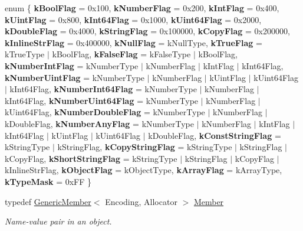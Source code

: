 \begin{DoxyCompactItemize}
\mbox{\label{classGenericValue_a57564d8ed9fe78975e047865be3bf7b9}} 
enum \{ \newline
{\bfseries k\+Bool\+Flag} = 0x100, 
{\bfseries k\+Number\+Flag} = 0x200, 
{\bfseries k\+Int\+Flag} = 0x400, 
{\bfseries k\+Uint\+Flag} = 0x800, 
\newline
{\bfseries k\+Int64\+Flag} = 0x1000, 
{\bfseries k\+Uint64\+Flag} = 0x2000, 
{\bfseries k\+Double\+Flag} = 0x4000, 
{\bfseries k\+String\+Flag} = 0x100000, 
\newline
{\bfseries k\+Copy\+Flag} = 0x200000, 
{\bfseries k\+Inline\+Str\+Flag} = 0x400000, 
{\bfseries k\+Null\+Flag} = k\+Null\+Type, 
{\bfseries k\+True\+Flag} = k\+True\+Type $\vert$ k\+Bool\+Flag, 
\newline
{\bfseries k\+False\+Flag} = k\+False\+Type $\vert$ k\+Bool\+Flag, 
{\bfseries k\+Number\+Int\+Flag} = k\+Number\+Type $\vert$ k\+Number\+Flag $\vert$ k\+Int\+Flag $\vert$ k\+Int64\+Flag, 
{\bfseries k\+Number\+Uint\+Flag} = k\+Number\+Type $\vert$ k\+Number\+Flag $\vert$ k\+Uint\+Flag $\vert$ k\+Uint64\+Flag $\vert$ k\+Int64\+Flag, 
{\bfseries k\+Number\+Int64\+Flag} = k\+Number\+Type $\vert$ k\+Number\+Flag $\vert$ k\+Int64\+Flag, 
\newline
{\bfseries k\+Number\+Uint64\+Flag} = k\+Number\+Type $\vert$ k\+Number\+Flag $\vert$ k\+Uint64\+Flag, 
{\bfseries k\+Number\+Double\+Flag} = k\+Number\+Type $\vert$ k\+Number\+Flag $\vert$ k\+Double\+Flag, 
{\bfseries k\+Number\+Any\+Flag} = k\+Number\+Type $\vert$ k\+Number\+Flag $\vert$ k\+Int\+Flag $\vert$ k\+Int64\+Flag $\vert$ k\+Uint\+Flag $\vert$ k\+Uint64\+Flag $\vert$ k\+Double\+Flag, 
{\bfseries k\+Const\+String\+Flag} = k\+String\+Type $\vert$ k\+String\+Flag, 
\newline
{\bfseries k\+Copy\+String\+Flag} = k\+String\+Type $\vert$ k\+String\+Flag $\vert$ k\+Copy\+Flag, 
{\bfseries k\+Short\+String\+Flag} = k\+String\+Type $\vert$ k\+String\+Flag $\vert$ k\+Copy\+Flag $\vert$ k\+Inline\+Str\+Flag, 
{\bfseries k\+Object\+Flag} = k\+Object\+Type, 
{\bfseries k\+Array\+Flag} = k\+Array\+Type, 
\newline
{\bfseries k\+Type\+Mask} = 0x\+FF
 \}
\item 
\mbox{\label{classGenericValue_a7ccf27c44058b4c11c3efc6473afb886}} 
typedef \hyperlink{structGenericMember}{Generic\+Member}$<$ Encoding, Allocator $>$ \hyperlink{classGenericValue_a7ccf27c44058b4c11c3efc6473afb886}{Member}
\begin{DoxyCompactList}\small\item\em Name-\/value pair in an object. \end{DoxyCompactList}\item 

\end{DoxyCompactItemize}
